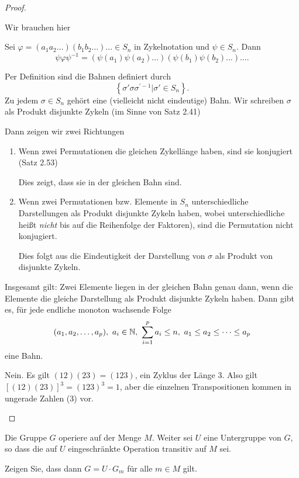 \begin{proof}
	\begin{parts}
	\item Wir brauchen hier
		\begin{tcolorbox}[title=Satz 2.52]
Sei $\varphi = (a_1a_2\dots)(b_1b_2\dots)\dots\in S_n$ in Zykelnotation und $\psi \in S_n$. Dann
\[
	\psi\varphi\psi^{-1}=(\psi(a_1)\psi(a_2)\dots)(\psi(b_1)\psi(b_2)\dots)\dots
.\] 
		\end{tcolorbox}
		Per Definition sind die Bahnen definiert durch
		\[
			\left\{ \sigma'\sigma\sigma^{\prime-1}|\sigma'\in S_n \right\} 
		.\] 
		Zu jedem $\sigma\in S_n$ gehört eine (vielleicht nicht eindeutige) Bahn. Wir schreiben $\sigma$ als Produkt disjunkte Zykeln (im Sinne von Satz 2.41) 

		Dann zeigen wir zwei Richtungen
		\begin{enumerate}[label=(\roman*)]
			\item Wenn zwei Permutationen die gleichen Zykellänge haben, sind sie konjugiert (Satz 2.53)

				Dies zeigt, dass sie in der gleichen Bahn sind.
			\item Wenn zwei Permutationen bzw. Elemente in $S_n$ unterschiedliche Darstellungen als Produkt disjunkte Zykeln haben, wobei unterschiedliche heißt \emph{nicht} bis auf die Reihenfolge der Faktoren), sind die Permutation nicht konjugiert.

				Dies folgt aus die Eindeutigkeit der Darstellung von $\sigma$ als Produkt von disjunkte Zykeln. 
		\end{enumerate}
		Insgesamt gilt: Zwei Elemente liegen in der gleichen Bahn genau dann, wenn die Elemente die gleiche Darstellung als Produkt disjunkte Zykeln haben. Dann gibt es, f\"{u}r jede endliche monoton wachsende Folge
		\[
			(a_1,a_2,\dots, a_p),~a_i\in \mathbb{N},~\sum_{i=1}^p a_i\le n,~a_1\le a_2\le\dots\le a_p
		\]
		eine Bahn.
	\item Nein. Es gilt $(12)(23)=(123)$, ein Zyklus der Länge 3. Also gilt $\left[ (12)(23) \right]^3=(123)^3=1$, aber die einzelnen Transpositionen kommen in ungerade Zahlen (3) vor.\qedhere
	\end{parts}
\end{proof}
\begin{Problem}
	Die Gruppe $G$ operiere auf der Menge $M$. Weiter sei $U$ eine Untergruppe von $G$, so dass die auf $U$ eingeschränkte Operation transitiv auf $M$ sei.

	Zeigen Sie, dass dann $G=U\cdot G_m$ f\"{u}r alle $m\in M$ gilt.
\end{Problem}
